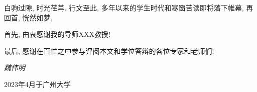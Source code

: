 \begin{thanks}
白驹过隙, 时光荏苒. 行文至此, 多年以来的学生时代和寒窗苦读即将落下帷幕, 再回首, 恍然如梦. 

首先, 由衷感谢我的导师XXX教授! 

最后, 感谢在百忙之中参与评阅本文和学位答辩的各位专家和老师们! 


\vskip 6pt
\hspace{10.5cm} \textit{魏伟明}

\vskip 6pt
\hspace{9.0cm} 2023年4月于广州大学 
\end{thanks}
